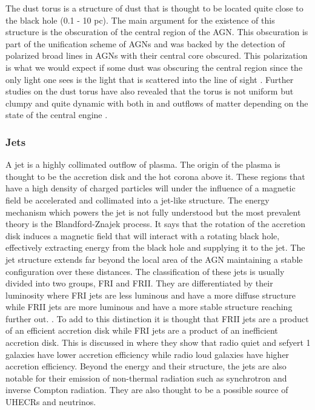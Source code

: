 \documentclass{article}
\begin{document}
The dust torus is a structure of dust that is thought to be located quite close to the black hole (0.1 - 10 pc). The main argument for the existence of this structure is the obscuration of the central region of the AGN. This obscuration 
is part of the unification scheme of AGNs and was backed by the detection of polarized broad lines in AGNs with their central core obscured. This polarization is what we would expect if some dust was obscuring the central region since the only light one sees is 
the light that is scattered into the line of sight \cite{MASON201597}. Further studies on the dust torus have also revealed that the torus is not uniform but clumpy and quite dynamic with both in and outflows of matter depending on the state of the central engine \cite{MASON201597}. 





\subsubsection{Jets}
\label{sec:jets}

A jet is a highly collimated outflow of plasma. The origin of the plasma is thought to be the accretion disk and the hot corona above it. These regions that have a high density of charged particles will under the influence of a magnetic field be accelerated and collimated into a jet-like structure.
The energy mechanism which powers the jet is not fully understood but the most prevalent theory is the Blandford-Znajek process. It says that the rotation of the accretion disk induces a magnetic field that will interact with a rotating black hole, effectively extracting energy from the black hole and supplying it to the jet. 
The jet structure extends far beyond the local area of the AGN maintaining a stable configuration over these distances. The classification of these jets is usually divided into two groups, FRI and FRII. They are differentiated by their luminosity where FRI jets are less luminous and have a more diffuse structure while FRII jets are more luminous and have a more stable structure reaching further out. \cite{walg2013relativistic}.
To add to this distinction it is thought that FRII jets are a product of an efficient accretion disk while FRI jets are a product of an inefficient accretion disk. This is discussed in \cite{Wei-Hao_2003} where they show that radio quiet and sefyert 1 galaxies have lower accretion efficiency while radio loud galaxies have higher accretion efficiency. 
Beyond the energy and their structure, the jets are also notable for their emission of non-thermal radiation such as synchrotron and inverse Compton radiation. They are also thought to be a possible source of UHECRs and neutrinos.
\end{document}
